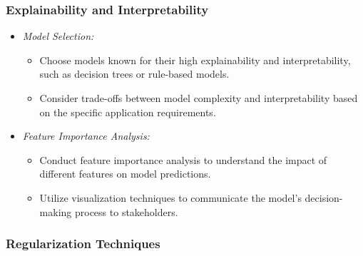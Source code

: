 \documentclass[12pt,a4paper,openright,twoside]{book}
\begin{document}
\subsubsection{Explainability and Interpretability}

\begin{itemize}

    \item \emph{Model Selection:}

    \begin{itemize}

        \item Choose models known for their high explainability and interpretability, such as decision trees or rule-based models.

        \item Consider trade-offs between model complexity and interpretability based on the specific application requirements.

    \end{itemize}
    

    \item \emph{Feature Importance Analysis:}

    \begin{itemize}

        \item Conduct feature importance analysis to understand the impact of different features on model predictions.

        \item Utilize visualization techniques to communicate the model's decision-making process to stakeholders.

    \end{itemize}

\end{itemize}

\subsubsection{Regularization Techniques}
\end{document}
